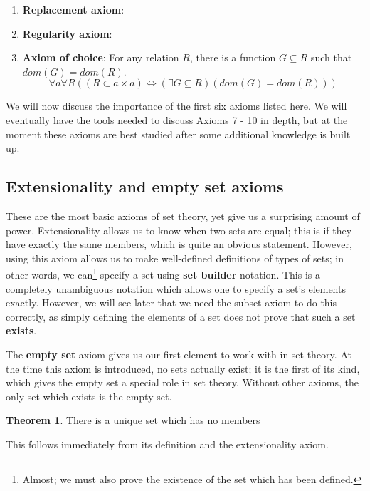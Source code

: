 \documentclass[11pt, oneside]{article}   	%
\theoremstyle{definition}
\newtheorem{theorem}{Theorem}[section]
\begin{document}
\begin{enumerate}
	\item \textbf{Replacement axiom}: 
	
	\item \textbf{Regularity axiom}: 
	
	\item \textbf{Axiom of choice}: For any relation $R$, there is a function $G\subseteq R$ such that $dom(G) = dom(R)$. 
	\begin{equation}
		\forall a\forall R ((R\subset a\times a)\iff (\exists G\subseteq R) (dom(G) = dom(R)))
	\end{equation}

\end{enumerate}

We will now discuss the importance of the first six axioms listed here. We will eventually have the tools needed to discuss 
Axioms 7 - 10 in depth, but at the moment these axioms are best studied after some additional knowledge is built up.

\subsection{Extensionality and empty set axioms}

These are the most basic axioms of set theory, yet give us a surprising amount of power. Extensionality allows us to know 
when two sets are equal; this is if they have exactly the same members, which is quite an obvious statement. However, using 
this axiom allows us to make well-defined definitions of types of sets; in other words, we can\footnote{Almost; we must also 
prove the existence of the set which has been defined.} specify a set using \textbf{set builder} notation. This is a completely 
unambiguous notation which allows one to specify a set's elements exactly. However, we will see later that we need the 
subset axiom to do this correctly, as simply defining the elements of a set does not prove that such a set \textbf{exists}. 

The \textbf{empty set} axiom gives us our first element to work with in set theory. At the time this axiom is introduced, no sets 
actually exist; it is the first of its kind, which gives the empty set a special role in set theory. Without other axioms, the only 
set which exists is the empty set. 
\begin{theorem}
	There is a unique set which has no members
\end{theorem}
This follows immediately from its definition and the extensionality axiom. 
\end{document}
